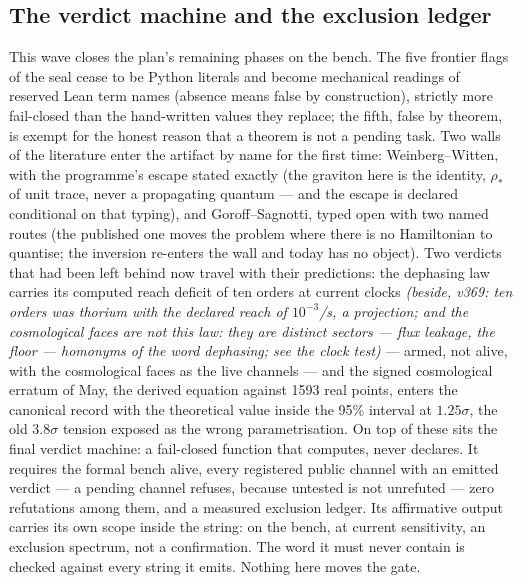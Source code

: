 \documentclass[11pt]{article}
\theoremstyle{definition}\newtheorem{deriv}{Derivation}
\begin{document}
\subsection*{The verdict machine and the exclusion ledger}This wave closes the plan's remaining phases on the bench. The five frontier flags of the seal cease to be Python literals and become mechanical readings of reserved Lean term names (absence means false by construction), strictly more fail-closed than the hand-written values they replace; the fifth, false by theorem, is exempt for the honest reason that a theorem is not a pending task. Two walls of the literature enter the artifact by name for the first time: Weinberg--Witten, with the programme's escape stated exactly (the graviton here is the identity, $\rho_\ast$ of unit trace, never a propagating quantum --- and the escape is declared conditional on that typing), and Goroff--Sagnotti, typed open with two named routes (the published one moves the problem where there is no Hamiltonian to quantise; the inversion re-enters the wall and today has no object). Two verdicts that had been left behind now travel with their predictions: the dephasing law carries its computed reach deficit of ten orders at current clocks \emph{(beside, v369: ten orders was thorium with the declared reach of $10^{-3}$/s, a projection; and the cosmological faces are not this law: they are distinct sectors --- flux leakage, the floor --- homonyms of the word dephasing; see the clock test)} --- armed, not alive, with the cosmological faces as the live channels --- and the signed cosmological erratum of May, the derived equation against 1593 real points, enters the canonical record with the theoretical value inside the 95\% interval at $1.25\sigma$, the old $3.8\sigma$ tension exposed as the wrong parametrisation. On top of these sits the final verdict machine: a fail-closed function that computes, never declares. It requires the formal bench alive, every registered public channel with an emitted verdict --- a pending channel refuses, because untested is not unrefuted --- zero refutations among them, and a measured exclusion ledger. Its affirmative output carries its own scope inside the string: on the bench, at current sensitivity, an exclusion spectrum, not a confirmation. The word it must never contain is checked against every string it emits. Nothing here moves the gate.
\end{document}
